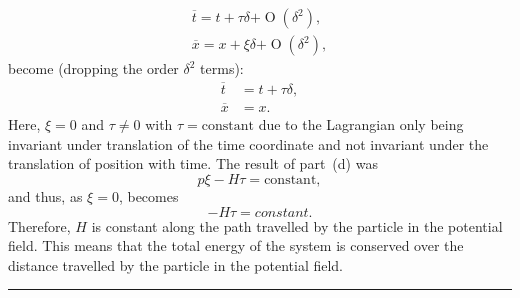 \begin{align*}
	\overline{t} = t + \tau\delta + \mathrel{O}(\delta^2),\\
	\overline{x} = x + \xi\delta + \mathrel{O}(\delta^2),
\end{align*}
become (dropping the order $\delta^2$ terms):
\begin{align*}
	\overline{t} &= t + \tau\delta,\\
	\overline{x} &= x.
\end{align*}
Here, $\xi=0$ and $\tau \ne 0$ with $\tau=\text{constant}$ due to the Lagrangian only being invariant under translation of the time coordinate and not invariant under the translation of position with time. The result of part~(d) was
\[
	p\xi - H\tau = \text{constant},
\]
and thus, as $\xi=0$, becomes
\[
	-H\tau = constant.
\]
Therefore, $H$ is constant along the path travelled by the particle in the potential field.  This means that the total energy of the system is conserved over the distance travelled by the particle in the potential field.
\par\noindent\rule{\textwidth}{1.5pt}


